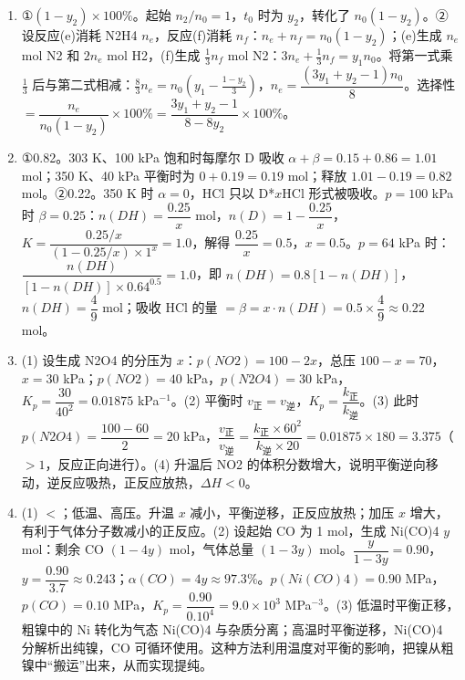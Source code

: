 \documentclass[UTF8,a4paper,zihao=5,oneside,openany,fontset=none]{ctexbook}
\def\mathrm#1{#1}\def\text#1{#1}\def\ensuremath#1{#1}\def\ce#1{#1}%
\newenvironment{jiexilist}{\small\begin{enumerate}[label={\textbf{\arabic*}.},leftmargin=1.6em,itemsep=0.3em,topsep=0.2em]}{\end{enumerate}}
\newcommand{\vz}{v_{\text{正}}}
\newcommand{\vn}{v_{\text{逆}}}
\newcommand{\kz}{k_{\text{正}}}
\newcommand{\kn}{k_{\text{逆}}}
\begin{document}
\begin{jiexilist}
\item ①$(1-y_2)\times100\%$。起始 $n_2/n_0=1$，$t_0$ 时为 $y_2$，转化了 $n_0(1-y_2)$。②设反应(e)消耗 \ce{N2H4} $n_\text{e}$，反应(f)消耗 $n_\text{f}$：$n_\text{e}+n_\text{f}=n_0(1-y_2)$；(e)生成 $n_\text{e}$ mol \ce{N2} 和 $2n_\text{e}$ mol \ce{H2}，(f)生成 $\frac13n_\text{f}$ mol \ce{N2}：$3n_\text{e}+\frac13n_\text{f}=y_1n_0$。将第一式乘 $\frac13$ 后与第二式相减：$\frac83n_\text{e}=n_0\left(y_1-\frac{1-y_2}{3}\right)$，$n_\text{e}=\dfrac{(3y_1+y_2-1)n_0}{8}$。选择性 $=\dfrac{n_\text{e}}{n_0(1-y_2)}\times100\%=\dfrac{3y_1+y_2-1}{8-8y_2}\times100\%$。
\item ①0.82。303 K、100 kPa 饱和时每摩尔 D 吸收 $\alpha+\beta=0.15+0.86=1.01$ mol；350 K、40 kPa 平衡时为 $0+0.19=0.19$ mol；释放 $1.01-0.19=0.82$ mol。②0.22。350 K 时 $\alpha=0$，HCl 只以 \ce{D*$x$HCl} 形式被吸收。$p=100$ kPa 时 $\beta=0.25$：$n(\mathrm{DH})=\dfrac{0.25}{x}$ mol，$n(\mathrm{D})=1-\dfrac{0.25}{x}$，$K=\dfrac{0.25/x}{(1-0.25/x)\times1^x}=1.0$，解得 $\dfrac{0.25}{x}=0.5$，$x=0.5$。$p=64$ kPa 时：$\dfrac{n(\mathrm{DH})}{[1-n(\mathrm{DH})]\times0.64^{0.5}}=1.0$，即 $n(\mathrm{DH})=0.8[1-n(\mathrm{DH})]$，$n(\mathrm{DH})=\dfrac49$ mol；吸收 HCl 的量 $=\beta=x\cdot n(\mathrm{DH})=0.5\times\dfrac49\approx0.22$ mol。
\item (1) 设生成 \ce{N2O4} 的分压为 $x$：$p(\ce{NO2})=100-2x$，总压 $100-x=70$，$x=30$ kPa；$p(\ce{NO2})=40$ kPa，$p(\ce{N2O4})=30$ kPa，$K_p=\dfrac{30}{40^2}=0.01875$ kPa$^{-1}$。(2) 平衡时 $\vz=\vn$，$K_p=\dfrac{\kz}{\kn}$。(3) 此时 $p(\ce{N2O4})=\dfrac{100-60}{2}=20$ kPa，$\dfrac{\vz}{\vn}=\dfrac{\kz\times60^2}{\kn\times20}=0.01875\times180=3.375$（$>1$，反应正向进行）。(4) 升温后 \ce{NO2} 的体积分数增大，说明平衡逆向移动，逆反应吸热，正反应放热，$\Delta H<0$。
\item (1) $<$；低温、高压。升温 $x$ 减小，平衡逆移，正反应放热；加压 $x$ 增大，有利于气体分子数减小的正反应。(2) 设起始 CO 为 1 mol，生成 \ce{Ni(CO)4} $y$ mol：剩余 CO $(1-4y)$ mol，气体总量 $(1-3y)$ mol。$\dfrac{y}{1-3y}=0.90$，$y=\dfrac{0.90}{3.7}\approx0.243$；$\alpha(\ce{CO})=4y\approx97.3\%$。$p(\ce{Ni(CO)4})=0.90$ MPa，$p(\ce{CO})=0.10$ MPa，$K_p=\dfrac{0.90}{0.10^4}=9.0\times10^3$ MPa$^{-3}$。(3) 低温时平衡正移，粗镍中的 Ni 转化为气态 \ce{Ni(CO)4} 与杂质分离；高温时平衡逆移，\ce{Ni(CO)4} 分解析出纯镍，CO 可循环使用。这种方法利用温度对平衡的影响，把镍从粗镍中“搬运”出来，从而实现提纯。
\end{jiexilist}
\newcommand{\cfourbeaker}[2]{%
  \fill[mainblue!7] (#1,0) rectangle ++(3.4,#2);
  \draw[thick] (#1,2.9)--(#1,0)--++(3.4,0)--++(0,2.9);}
\end{document}
